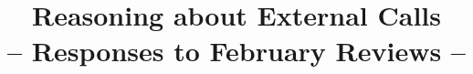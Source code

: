 \documentclass{article}
\begin{document}
\title{Reasoning about External Calls\\ \large{ -- Responses to February Reviews --}} %













\maketitle 
\end{document}
